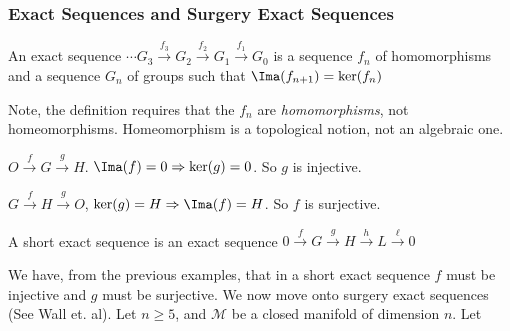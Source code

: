 \documentclass[crop=false,class=book,oneside]{standalone}                      %
\begin{document}
            \subsubsection{%
                Exact Sequences and Surgery Exact Sequences
            }
                \begin{definition}
                    An exact sequence
                    $\cdots G_{3}%
                     \overset{f_{3}}{\rightarrow}G_{2}%
                     \overset{f_{2}}{\rightarrow}G_{1}%
                     \overset{f_{1}}{\rightarrow}G_{0}$
                    is a sequence $f_{n}$ of homomorphisms
                    and a sequence $G_{n}$ of groups such that
                    $\Ima(f_{n+1})=\ker(f_{n})$
                \end{definition}
                \begin{remark}
                    Note, the definition requires that the $f_{n}$
                    are \textit{homomorphisms}, not homeomorphisms.
                    Homeomorphism is a topological notion,
                    not an algebraic one.
                \end{remark}
                \begin{example}
                    $O\overset{f}{\rightarrow}G%
                     \overset{g}{\rightarrow}H$.
                    $\Ima(f)=0\Rightarrow\ker(g)=0$.
                    So $g$ is injective.
                \end{example}
                \begin{example}
                    $G\overset{f}{\rightarrow}%
                     H\overset{g}{\rightarrow}O$,
                    $\ker(g)=H\Rightarrow\Ima(f)=H$.
                    So $f$ is surjective.
                \end{example}
                \begin{definition}
                    A short exact sequence is an exact sequence
                    $0\overset{f}{\rightarrow}%
                     G\overset{g}{\rightarrow}%
                     H\overset{h}{\rightarrow}%
                     L\overset{\ell}{\rightarrow}0$
                \end{definition}
                We have, from the previous examples,
                that in a short exact sequence $f$ must be
                injective and $g$ must be surjective. We now
                move onto surgery exact sequences (See Wall et. al).
                Let $n\geq 5$, and $\mathcal{M}$ be a closed
                manifold of dimension $n$. Let
\end{document}
